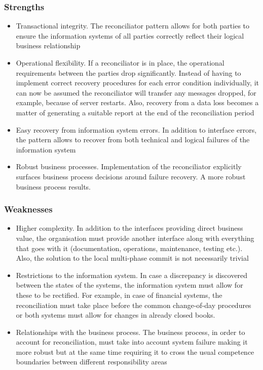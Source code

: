 \documentclass[10pt,a4paper]{article}
\begin{document}
\subsubsection{Strengths}
	\begin{itemize}
 		\item Transactional integrity. The reconciliator pattern allows for both parties to ensure the information systems of all parties correctly reflect their logical business relationship  
		\item Operational flexibility. If a reconciliator is in place, the operational requirements between the parties drop significantly. Instead of having to implement correct recovery procedures for each error condition individually, it can now be assumed the reconciliator will transfer any messages dropped, for example, because of server restarts. Also, recovery from a data loss becomes a matter of generating a suitable report at the end of the reconciliation period
		\item Easy recovery from information system errors. In addition to interface errors, the pattern allows to recover from both technical and logical failures of the information system
		\item Robust business processes. Implementation of the reconciliator explicitly surfaces business process decisions around failure recovery. A more robust business process results. 
	\end{itemize}
	
\subsubsection{Weaknesses}	
	 	\begin{itemize}
			\item Higher complexity. In addition to the interfaces providing direct business value, the organisation must provide another interface along with everything that goes with it (documentation, operations, maintenance, testing etc.). Also, the solution to the local multi-phase commit is not necessarily trivial
			\item Restrictions to the information system. In case a discrepancy is discovered between the states of the systems, the information system must allow for these to be rectified. For example, in case of financial systems, the reconciliation must take place before the common change-of-day procedures or both systems must allow for changes in already closed books. 
			\item Relationships with the business process. The business process, in order to account for reconciliation, must take into account system failure making it more robust but at the same time requiring it to cross the usual competence boundaries between different responsibility areas
		\end{itemize}
\end{document}
